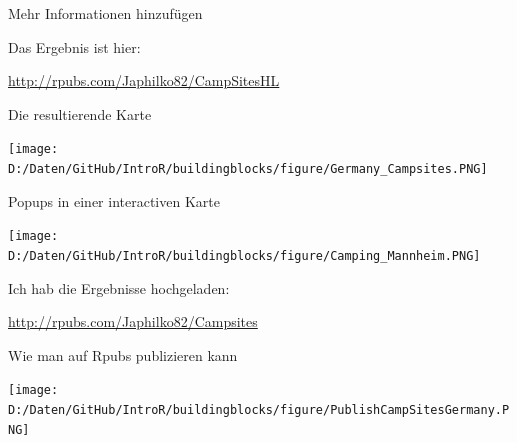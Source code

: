 \documentclass[ignorenonframetext,]{beamer}
\newenvironment{Shaded}{\begin{snugshade}}{\end{snugshade}}
\newcommand{\KeywordTok}[1]{\textcolor[rgb]{0.26,0.66,0.93}{\textbf{#1}}}
\newcommand{\DataTypeTok}[1]{\textcolor[rgb]{0.74,0.68,0.62}{\underline{#1}}}
\newcommand{\CharTok}[1]{\textcolor[rgb]{0.02,0.61,0.04}{#1}}
\newcommand{\StringTok}[1]{\textcolor[rgb]{0.02,0.61,0.04}{#1}}
\newcommand{\CommentTok}[1]{\textcolor[rgb]{0.00,0.40,1.00}{\textit{#1}}}
\newcommand{\OperatorTok}[1]{\textcolor[rgb]{0.74,0.68,0.62}{#1}}
\newcommand{\NormalTok}[1]{\textcolor[rgb]{0.74,0.68,0.62}{#1}}
\begin{document}
\begin{frame}[fragile]{Mehr Informationen hinzufügen}

\begin{Shaded}
\end{Shaded}

\begin{Shaded}
\end{Shaded}

Das Ergebnis ist hier:

\url{http://rpubs.com/Japhilko82/CampSitesHL}

\end{frame}

\begin{frame}{Die resultierende Karte}

\texttt{[image: D:/Daten/GitHub/IntroR/buildingblocks/figure/Germany\_Campsites.PNG]}

\end{frame}

\begin{frame}{Popups in einer interactiven Karte}

\texttt{[image: D:/Daten/GitHub/IntroR/buildingblocks/figure/Camping\_Mannheim.PNG]}

Ich hab die Ergebnisse hochgeladen:

\url{http://rpubs.com/Japhilko82/Campsites}

\end{frame}

\begin{frame}{Wie man auf Rpubs publizieren kann}

\texttt{[image: D:/Daten/GitHub/IntroR/buildingblocks/figure/PublishCampSitesGermany.PNG]}

\end{frame}
\end{document}
